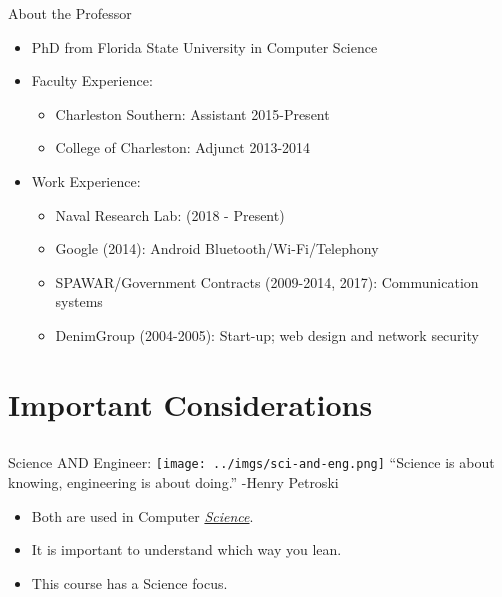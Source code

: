 \documentclass{beamer}
\begin{document}
\begin{frame}{About the Professor}
\begin{itemize}
\item PhD from Florida State University in Computer Science
\item Faculty Experience:
\begin{itemize}
\item Charleston Southern: Assistant 2015-Present
\item College of Charleston: Adjunct 2013-2014
\end{itemize}
\item Work Experience:
\begin{itemize}
\item Naval Research Lab: (2018 - Present)
\item Google (2014): Android Bluetooth/Wi-Fi/Telephony
\item SPAWAR/Government Contracts (2009-2014, 2017): Communication systems
\item DenimGroup (2004-2005): Start-up; web design and network security
\end{itemize}
\end{itemize}
\end{frame}

\section{Important Considerations}
\subsection{}

\begin{frame}{Science AND Engineer:}
\texttt{[image: ../imgs/sci-and-eng.png]}
``Science is about knowing, engineering is about doing.'' -Henry Petroski
\begin{itemize}
\item Both are used in Computer \underline{\textit{Science}}.
\item It is important to understand which way you lean.
\item This course has a Science focus.
\end{itemize}
\end{frame}
\end{document}
